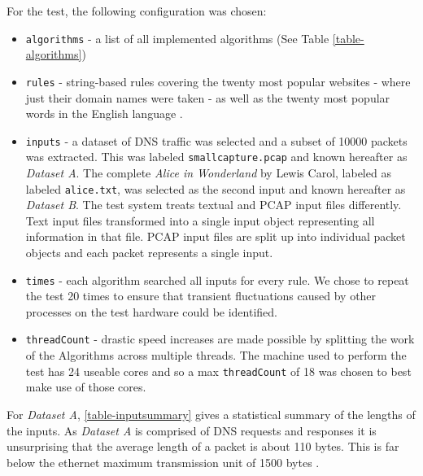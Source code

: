 \documentclass[9pt, conference]{IEEEtran}
\begin{document}
For the test, the following configuration was chosen:
\begin{itemize}
  \item \texttt{algorithms} - a list of all implemented algorithms (See Table \ref{table-algorithms}) 
  \item \texttt{rules} - string-based rules covering the twenty most popular websites \citep{alexa2016} - where just their domain names were taken - as well as the twenty most popular words in the English language \citep{oed2016}.
  \item \texttt{inputs} - a dataset of DNS traffic was selected and a subset of 10000 packets was extracted. This was labeled \texttt{smallcapture.pcap} and known hereafter as \textit{Dataset A}. The complete \textit{Alice in Wonderland} by Lewis Carol, labeled as labeled \texttt{alice.txt}, was selected as the second input and known hereafter as \textit{Dataset B}. The test system treats textual and PCAP input files differently. Text input files transformed into a single input object representing all information in that file. PCAP input files are split up into individual packet objects and each packet represents a single input.
  \item \texttt{times} - each algorithm searched all inputs for every rule. We chose to repeat the test 20 times to ensure that transient fluctuations caused by other processes on the test hardware could be identified.
  \item \texttt{threadCount} - drastic speed increases are made possible by splitting the work of the Algorithms across multiple threads. The machine used to perform the test has 24 useable cores and so a max \texttt{threadCount} of 18 was chosen to best make use of those cores. 
\end{itemize}


For \textit{Dataset A}, \ref{table-inputsummary} gives a statistical summary of the lengths of the inputs. As \textit{Dataset A} is comprised of DNS requests and responses it is unsurprising that the average length of a packet is about 110 bytes. This is far below the ethernet maximum transmission unit of 1500 bytes \citep{rfc894}. 

\begin{table}[!htb]
  \centering
  \caption{\textit{Dataset A} packet length statistical summary (in bytes).}
  \label{table-inputsummary}
\end{table}
\end{document}
